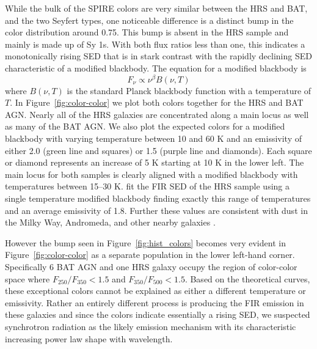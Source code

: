 While the bulk of the SPIRE colors are very similar between the HRS and BAT, and the two Seyfert types, one noticeable difference is a distinct bump in the color distribution around 0.75. This bump is absent in the HRS sample and mainly is made up of Sy 1s. With both flux ratios less than one, this indicates a monotonically rising SED that is in stark contrast with the rapidly declining SED characteristic of a modified blackbody. The equation for a modified blackbody is
\begin{equation}\label{eq:mod_blackbody}
F_{\nu} \propto \nu^{\beta}B(\nu, T)
\end{equation}
\noindent where $B(\nu, T)$ is the standard Planck blackbody function with a temperature of $T$. In Figure~\ref{fig:color-color} we plot both colors together for the HRS and BAT AGN. Nearly all of the HRS galaxies are concentrated along a main locus as well as many of the BAT AGN. We also plot the expected colors for a modified blackbody with varying temperature between 10 and 60 K and an emissivity of either 2.0 (green line and squares) or 1.5 (purple line and diamonds). Each square or diamond represents an increase of 5 K starting at 10 K in the lower left. The main locus for both samples is clearly aligned with a modified blackbody with temperatures between 15--30 K. \cite{Cortese:2014qq} fit the FIR SED of the HRS sample using a single temperature modified blackbody finding exactly this range of temperatures and an average emissivity of 1.8. Further these values are consistent with dust in the Milky Way, Andromeda, and other nearby galaxies \citep{Galametz:2012uq, Boselli:2012qv, Smith:2012fj}. 

However the bump seen in Figure~\ref{fig:hist_colors} becomes very evident in Figure~\ref{fig:color-color} as a separate population in the lower left-hand corner. Specifically 6 BAT AGN and one HRS galaxy occupy the region of color-color space where $F_{250}/F_{350} < 1.5$ and $F_{350}/F_{500} < 1.5$. Based on the theoretical curves, these exceptional colors cannot be explained as either a different temperature or emissivity. Rather an entirely different process is producing the FIR emission in these galaxies and since the colors indicate essentially a rising SED, we suspected synchrotron radiation as the likely emission mechanism with its characteristic increasing power law shape with wavelength.
  
  
  
  